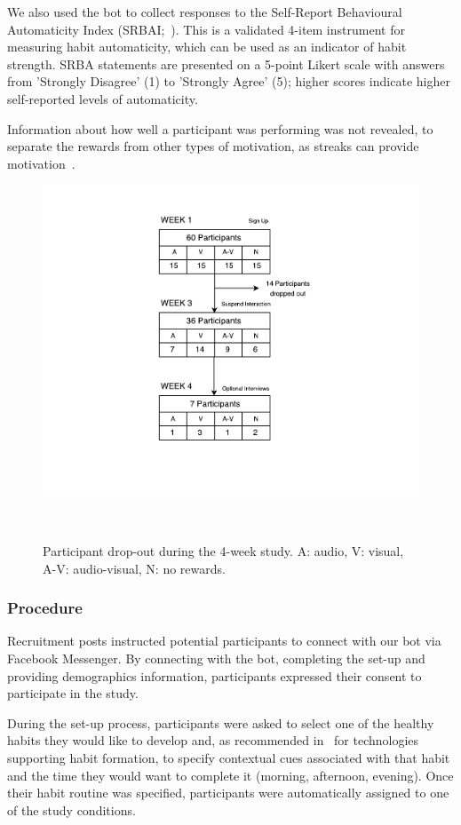 \documentclass{scaffold/sigchi}
\begin{document}
We also used the bot to collect responses to the Self-Report Behavioural Automaticity Index (SRBAI;~\cite{article_4q_SRBAI}). This is a validated 4-item instrument for measuring habit automaticity, which can be used as an indicator of habit strength. SRBA statements are presented on a 5-point Likert scale with answers from 'Strongly Disagree' (1) to 'Strongly Agree' (5); higher scores indicate higher self-reported levels of automaticity.

Information about how well a participant was performing was not revealed, to separate the rewards from other types of motivation, as streaks can provide motivation~\cite{article_dont_kick_habit}. 



\begin{figure}
  \centering
  \includegraphics[width=.95\columnwidth]{figures/study-flow.pdf}
  \caption{Participant drop-out during the 4-week study. A: audio, V: visual, A-V: audio-visual, N: no rewards.}~\label{fig:study_dropout}
\end{figure}

\subsubsection{Procedure}
Recruitment posts instructed potential participants to connect with our bot via Facebook Messenger. By connecting with the bot, completing the set-up and providing demographics information, participants expressed their consent to participate in the study.

During the set-up process, participants were asked to select one of the healthy habits they would like to develop and, as recommended in~\cite{article_dont_forget_your_pill} for technologies supporting habit formation, to specify contextual cues associated with that habit and the time they would want to complete it (morning, afternoon, evening). Once their habit routine was specified, participants were automatically assigned to one of the study conditions. 
\end{document}
